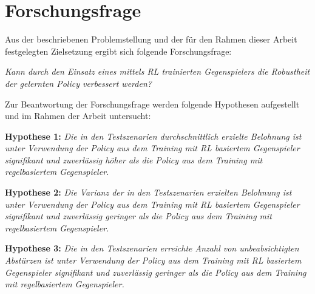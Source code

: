 \section{Forschungsfrage}

Aus der beschriebenen Problemstellung und der für den Rahmen dieser Arbeit festgelegten Zielsetzung ergibt sich folgende Forschungsfrage: 

\textit{Kann durch den Einsatz eines mittels RL trainierten Gegenspielers die Robustheit der gelernten Policy verbessert werden?}

Zur Beantwortung der Forschungsfrage werden folgende Hypothesen aufgestellt und im Rahmen der Arbeit untersucht:

\textbf{Hypothese 1:}
\textit{Die in den Testszenarien durchschnittlich erzielte Belohnung ist unter Verwendung der Policy aus dem Training mit RL basiertem Gegenspieler signifikant und zuverlässig höher als die Policy aus dem Training mit regelbasiertem Gegenspieler.}

\textbf{Hypothese 2:}
\textit{Die Varianz der in den Testszenarien erzielten Belohnung ist unter Verwendung der Policy aus dem Training mit RL basiertem Gegenspieler signifikant und zuverlässig geringer als die Policy aus dem Training mit regelbasiertem Gegenspieler.}

\textbf{Hypothese 3:}
\textit{Die in den Testszenarien erreichte Anzahl von unbeabsichtigten Abstürzen ist unter Verwendung der Policy aus dem Training mit RL basiertem Gegenspieler signifikant und zuverlässig geringer als die Policy aus dem Training mit regelbasiertem Gegenspieler.}

